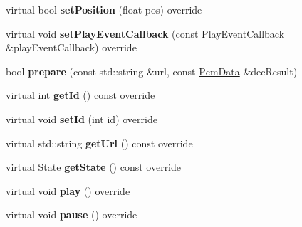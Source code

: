 \begin{DoxyCompactItemize}
virtual bool {\bfseries set\+Position} (float pos) override
\item 
\mbox{\label{classcocos2d_1_1experimental_1_1PcmAudioPlayer_a31f594374f25903c747b004cdc931268}} 
virtual void {\bfseries set\+Play\+Event\+Callback} (const Play\+Event\+Callback \&play\+Event\+Callback) override
\item 
\mbox{\label{classcocos2d_1_1experimental_1_1PcmAudioPlayer_a27cca9ac7d83d3702345a25e7fd4bb04}} 
bool {\bfseries prepare} (const std\+::string \&url, const \hyperlink{structcocos2d_1_1experimental_1_1PcmData}{Pcm\+Data} \&dec\+Result)
\item 
\mbox{\label{classcocos2d_1_1experimental_1_1PcmAudioPlayer_a9e333a888adcdeed3877b5b4bdedafe3}} 
virtual int {\bfseries get\+Id} () const override
\item 
\mbox{\label{classcocos2d_1_1experimental_1_1PcmAudioPlayer_a32251b0836c02742d862ab9f223b13d7}} 
virtual void {\bfseries set\+Id} (int id) override
\item 
\mbox{\label{classcocos2d_1_1experimental_1_1PcmAudioPlayer_a9b4159b6db3583e4a8712a7448870540}} 
virtual std\+::string {\bfseries get\+Url} () const override
\item 
\mbox{\label{classcocos2d_1_1experimental_1_1PcmAudioPlayer_ab3a0251834127bbda437c1d1349fc574}} 
virtual State {\bfseries get\+State} () const override
\item 
\mbox{\label{classcocos2d_1_1experimental_1_1PcmAudioPlayer_a490faba96fee1b490cb12b141aa92aab}} 
virtual void {\bfseries play} () override
\item 
\mbox{\label{classcocos2d_1_1experimental_1_1PcmAudioPlayer_a9ba9bb89dbe696c9b79b88d4f09ed5f3}} 
virtual void {\bfseries pause} () override
\item 
\mbox{\label{classcocos2d_1_1experimental_1_1PcmAudioPlayer_a52cdf35caef99d5404b7a42acd4a4651}} 

\end{DoxyCompactItemize}

